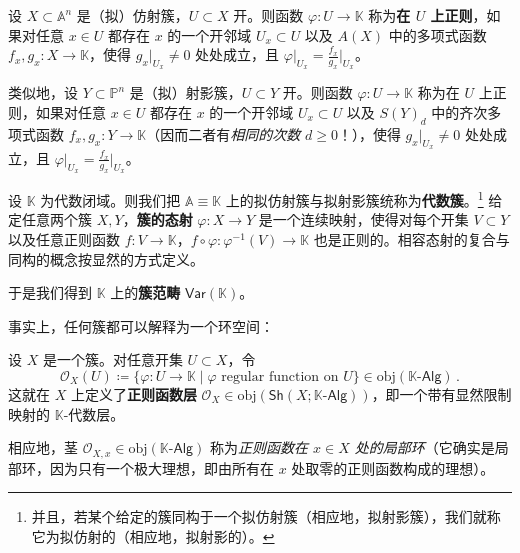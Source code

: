 \begin{Def}\label{regularfunc}
设 $X\subset\mathbb{A}^n$ 是（拟）仿射簇，$U\subset X$ 开。则函数 $\varphi:U\rightarrow \mathbb{K}$ 称为\textbf{在 $U$ 上正则}，如果对任意 $x\in U$ 都存在 $x$ 的一个开邻域 $U_x\subset U$ 以及 $A(X)$ 中的多项式函数 $f_x, g_x:X\rightarrow \mathbb{K}$，使得 $g_x|_{U_x}\neq 0$ 处处成立，且 $\varphi|_{U_x}=\frac{f_x}{g_x}\big|_{U_x}$。

类似地，设 $Y\subset\mathbb{P}^n$ 是（拟）射影簇，$U\subset Y$ 开。则函数 $\varphi:U\rightarrow \mathbb{K}$ 称为在 $U$ 上正则，如果对任意 $x\in U$ 都存在 $x$ 的一个开邻域 $U_x\subset U$ 以及 $S(Y)_d$ 中的齐次多项式函数 $f_x, g_x:Y\rightarrow \mathbb{K}$（因而二者有\textit{相同的次数} $d\geq 0$！），使得 $g_x|_{U_x}\neq 0$ 处处成立，且 $\varphi|_{U_x}=\frac{f_x}{g_x}\big|_{U_x}$。 
\end{Def}

\begin{Def}
设 $\mathbb{K}$ 为代数闭域。则我们把 $\mathbb{A}\equiv\mathbb{K}$ 上的拟仿射簇与拟射影簇统称为\textbf{代数簇}。\footnote{并且，若某个给定的簇同构于一个拟仿射簇（相应地，拟射影簇），我们就称它为拟仿射的（相应地，拟射影的）。} 给定任意两个簇 $X,Y$，\textbf{簇的态射} $\varphi:X\rightarrow Y$ 是一个连续映射，使得对每个开集 $V\subset Y$ 以及任意正则函数 $f:V\rightarrow\mathbb{K}$，$f\circ\varphi:\varphi^{-1}(V)\rightarrow\mathbb{K}$ 也是正则的。相容态射的复合与同构的概念按显然的方式定义。

于是我们得到 $\mathbb{K}$ 上的\textbf{簇范畴} $\mathsf{Var}(\mathbb{K})$。
\end{Def}

事实上，任何簇都可以解释为一个环空间：

\begin{Def}\label{sheafregfcts}
设 $X$ 是一个簇。对任意开集 $U\subset X$，令
\begin{equation}
	\mathcal{O}_X(U)\coloneqq\{\varphi:U\rightarrow \mathbb{K} \mid \varphi\text{ regular function on $U$}\}\in\text{obj}(\mathbb{K}\text{-}\mathsf{Alg})\,.
\end{equation}
这就在 $X$ 上定义了\textbf{正则函数层} $\mathcal{O}_X\in\text{obj}(\mathsf{Sh}(X;\mathbb{K}\text{-}\mathsf{Alg}))$，即一个带有显然限制映射的 $\mathbb{K}$-代数层。

相应地，茎 $\mathcal{O}_{X,x}\in\text{obj}(\mathbb{K}\text{-}\mathsf{Alg})$ 称为\textit{正则函数在 $x\in X$ 处的局部环}（它确实是局部环，因为只有一个极大理想，即由所有在 $x$ 处取零的正则函数构成的理想）。
\end{Def}

